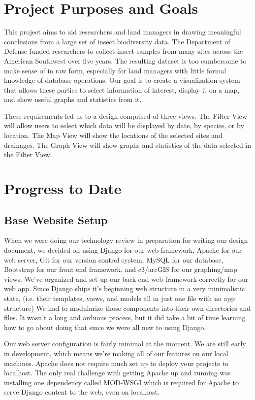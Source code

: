 \documentclass[journal]{IEEEtran}
\begin{document}
\section{Project Purposes and Goals} %
This project aims to aid researchers and land managers in drawing meaningful
conclusions from a large set of insect biodiversity data. The Department of
Defense funded researchers to collect insect samples from many sites across the
American Southwest over five years. The resulting dataset is too cumbersome to
make sense of in raw form, especially for land managers with little formal
knowledge of database operations. Our goal is to create a visualization system
that allows these parties to select information of interest, display it on a
map, and show useful graphs and statistics from it.


These requirements led us to a design comprised of three views. The Filter
View will allow users to select which data will be displayed by date, by
species, or by location. The Map View will show the locations of the selected
sites and drainages. The Graph View will show graphs and statistics of the data
selected in the Filter View.


\section{Progress to Date}

\subsection{Base Website Setup} %
When we were doing our technology review in preparation for writing our design document, we decided on using Django for our web framework, Apache for our web server, Git for our version control system, MySQL for our database, Bootstrap for our front end framework, and c3/arcGIS for our graphing/map views.
We’ve organized and set up our back-end web framework correctly for our web app.
Since Django ships it’s beginning web structure in a very minimalistic state, (i.e. their templates, views, and models all in just one file with no app structure) We had to modularize those components into their own directories and files.
It wasn’t a long and arduous process, but it did take a bit of time learning how to go about doing that since we were all new to using Django.

Our web server configuration is fairly minimal at the moment.
We are still early in development, which means we’re making all of our features on our local machines.
Apache does not require much set up to deploy your projects to localhost.
The only real challenge with getting Apache up and running was installing one dependency called MOD-WSGI which is required for Apache to serve Django content to the web, even on localhost.
\end{document}
